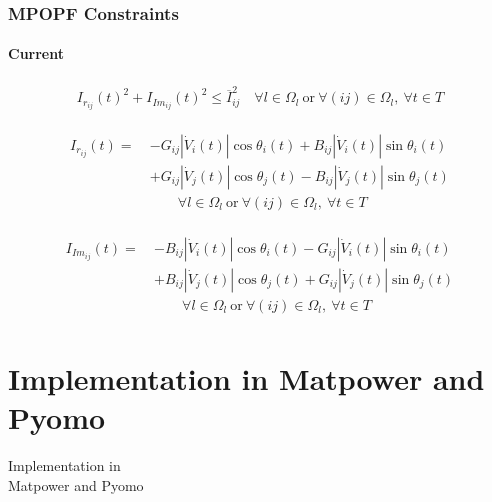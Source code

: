 \documentclass[
	11pt, %
	aspectratio=169, %
]{beamer}
\begin{document}
\begin{frame}
    \frametitle{MPOPF Constraints}
    \framesubtitle{Current} %

    \begin{align}
    \label{eq:Mcons_current}
        I_{r_{ij}}(t)^{2}+ I_{Im_{ij}}(t)^{2} \leq \overline{I}_{ij}^{2} \quad   \forall l \in \Omega_{l} \ \text{or} \ \forall (ij) \in \Omega_{l},\ \forall t \in T
    \end{align}

    \begin{align}
    \label{eq:Mexpr_i_re}
        \begin{split}
            I_{r_{ij}}(t) =\ &-G_{ij}\left\lvert \dot{V}_{i}(t) \right\rvert \cos{\theta_{i}(t)} + B_{ij}\left\lvert \dot{V}_{i}(t) \right\rvert \sin{\theta_{i}(t)} \\
                    &+ G_{ij}\left\lvert \dot{V}_{j}(t) \right\rvert \cos{\theta_{j}(t)} - B_{ij}\left\lvert \dot{V}_{j}(t) \right\rvert \sin{\theta_{j}(t)} \\
            &\qquad \forall l \in \Omega_{l} \ \text{or} \ \forall (ij) \in \Omega_{l},\ \forall t \in T
        \end{split}
    \end{align}

    \begin{align}
    \label{eq:Mexpr_i_imag}
        \begin{split}
            I_{Im_{ij}}(t) =\ &-B_{ij}\left\lvert \dot{V}_{i}(t) \right\rvert \cos{\theta_{i}(t)} - G_{ij}\left\lvert \dot{V}_{i}(t) \right\rvert \sin{\theta_{i}(t)} \\
            &+ B_{ij}\left\lvert \dot{V}_{j}(t) \right\rvert \cos{\theta_{j}(t)} + G_{ij}\left\lvert \dot{V}_{j}(t) \right\rvert \sin{\theta_{j}(t)} \\
            &\qquad \forall l \in \Omega_{l} \ \text{or} \ \forall (ij) \in \Omega_{l},\ \forall t \in T
        \end{split}
    \end{align}

\end{frame}


\section{Implementation in Matpower and Pyomo}

\begin{frame}[plain] %
	\begin{center}
		{\Huge Implementation in \\Matpower and Pyomo}
		
		\bigskip\bigskip %
		
	\end{center}
\end{frame}
\end{document}
